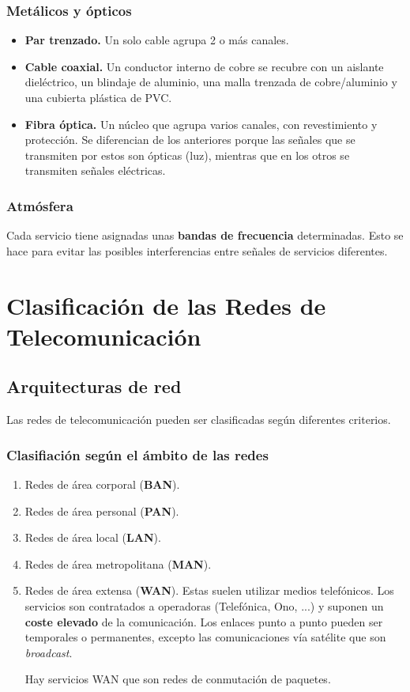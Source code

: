 \documentclass[a4paper]{book}
\begin{document}
\subsubsection{Metálicos y ópticos}
\vspace{1.5\parskip}
\begin{itemize}
  \item \textbf{Par trenzado.} Un solo cable agrupa 2 o más canales.
  \item \textbf{Cable coaxial.} Un conductor interno de cobre se recubre con un aislante dieléctrico, un blindaje de aluminio, una malla trenzada de cobre/aluminio y una cubierta plástica de PVC.
  \item \textbf{Fibra óptica.} Un núcleo que agrupa varios canales, con revestimiento y protección. Se diferencian de los anteriores porque las señales que se transmiten por estos son ópticas (luz), mientras que en los otros se transmiten señales eléctricas.
\end{itemize}

\subsubsection{Atmósfera}
Cada servicio tiene asignadas unas \textbf{bandas de frecuencia} determinadas. Esto se hace para evitar las posibles interferencias entre señales de servicios diferentes.


\section{Clasificación de las Redes de Telecomunicación}
\subsection{Arquitecturas de red}
Las redes de telecomunicación pueden ser clasificadas según diferentes criterios.
\subsubsection{Clasifiación según el ámbito de las redes}
\vspace{\parskip}
\begin{enumerate}
  \item Redes de área corporal (\textbf{BAN}).
  \item Redes de área personal (\textbf{PAN}).
  \item Redes de área local (\textbf{LAN}).
  \item Redes de área metropolitana (\textbf{MAN}).
  \item Redes de área extensa (\textbf{WAN}). Estas suelen utilizar medios telefónicos. Los servicios son contratados a operadoras (Telefónica, Ono, ...) y suponen un \textbf{coste elevado} de la comunicación. Los enlaces punto a punto pueden ser temporales o permanentes, excepto las comunicaciones vía satélite que son \textsl{broadcast}.

        Hay servicios WAN que son redes de conmutación de paquetes.
\end{enumerate}
\end{document}
